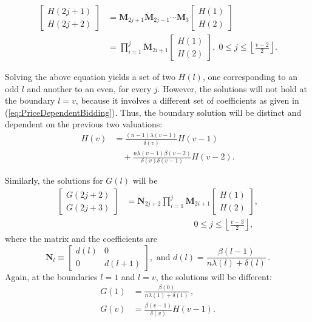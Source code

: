 \documentclass{comjnl}
\begin{document}
\begin{align}\label{eq:PriceDependent_Hl}
\begin{bmatrix} H(2j+1)\\
H(2j+2) \end{bmatrix} &= \mathbf{M}_{2j+1} \mathbf{M}_{2j-1}
\cdots \mathbf{M}_{3}
\begin{bmatrix}H(1)\\
H(2) \end{bmatrix} \\
&= \prod_{i=1}^{j} \mathbf{M}_{2i+1}
\begin{bmatrix}H(1)\\
H(2) \end{bmatrix} , \; 0\leq j \leq \left\lfloor\frac{v-2}{2}
\right\rfloor\nonumber .
\end{align}

Solving the above equation yields a set of two $H(l)$, one
corresponding to an odd $l$ and another to an even, for every $j$.
However, the solutions will not hold at the boundary $l=v$,
because it involves a different set of coefficients as given in
(\ref{eq:PriceDependentBidding}). Thus, the boundary solution will
be distinct and dependent on the previous two valuations:
\begin{equation}\label{eq:PriceDependent_Hl_Boundary}
\begin{split}
H(v) &= \frac{(n-1)\lambda(v-1)}{\delta(v)} H(v-1) \\
&\quad +
\frac{n\lambda(v-1)\beta(v-2)}{\delta(v)\delta(v-1)}H(v-2).
\end{split}
\end{equation}

Similarly, the solutions for $G(l)$ will be
\begin{equation} \label{eq:PriceDependent_Gl}
\begin{split}
\begin{bmatrix}  G(2j+2)\\
G(2j+3) \end{bmatrix} &= \mathbf{N}_{2j+2} \prod_{i=1}^{j}
\mathbf{M}_{2i+1}
\begin{bmatrix} H(1)\\
H(2)\end{bmatrix} , \\
&\qquad\qquad\qquad\qquad  0\leq j \leq \left\lfloor\frac{v-3}{2}
\right\rfloor ,
\end{split}
\end{equation}
where the matrix and the coefficients are
\begin{equation}
\mathbf{N}_l \equiv \begin{bmatrix} d(l) & 0 \\
0 & d(l+1)\end{bmatrix},  \textrm{ and }  d(l) =
\frac{\beta(l-1)}{n\lambda(l)+\delta(l)}\,.
\end{equation}
Again, at the boundaries $l=1$ and $l=v$, the solutions will be
different:
\begin{align}\label{eq:PriceDependent_Gl_Boundary}
G(1) &= \frac{\beta(0)}{n\lambda(1)+\delta(1)}\,,\\
G(v) &= \frac{\beta(v-1)}{\delta(v)} H(v-1) . \nonumber
\end{align}
\end{document}
